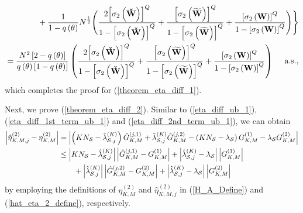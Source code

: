 \documentclass[11pt, draftclsnofoot, onecolumn]{IEEEtran}
\newcommand{\cW}{{\check{W}}}
\newcommand{\tW}{{\widetilde{W}}}
\begin{document}
\begin{IEEEproof}
\begin{align}
& \qquad \qquad + \frac{1}{{1 - q\left( \theta  \right)}}{N^{\frac{1}{2}}}\Bigg( {\frac{{2{{\left[ {{\sigma _2}\left( {\bf{\cW}} \right)} \right]}^Q}}}{{1 - {{\left[ {{\sigma _2}\left( {\bf{\cW}} \right)} \right]}^Q}}} + \frac{{{{\left[ {{\sigma _2}\left( {\bf{\tW}} \right)} \right]}^Q}}}{{1 - {{\left[ {{\sigma _2}\left( {\bf{\tW}} \right)} \right]}^Q}}} + \frac{{{{\left[ {{\sigma _2}\left( {\bf{W}} \right)} \right]}^Q}}}{{1 - {{\left[ {{\sigma _2}\left( {\bf{W}} \right)} \right]}^Q}}}} \Bigg) \Bigg\}\\
& = \frac{ {N^2} \left[{2 - q\left( \theta  \right)} \right] }{{q\left( \theta  \right)\left[ {1 - q\left( \theta  \right)} \right]}}\left( {\frac{{2{{\left[ {{\sigma _2}\left( {\bf{\cW}} \right)} \right]}^Q}}}{{1 - {{\left[ {{\sigma _2}\left( {\bf{\cW}} \right)} \right]}^Q}}} + \frac{{{{\left[ {{\sigma _2}\left( {\bf{\tW}} \right)} \right]}^Q}}}{{1 - {{\left[ {{\sigma _2}\left( {\bf{\tW}} \right)} \right]}^Q}}} + \frac{{{{\left[ {{\sigma _2}\left( {\bf{W}} \right)} \right]}^Q}}}{{1 - {{\left[ {{\sigma _2}\left( {\bf{W}} \right)} \right]}^Q}}}} \right) \quad \text{ a.s.},
\end{align}
which completes the proof for (\ref{theorem_eta_diff_1}).

Next, we prove (\ref{theorem_eta_diff_2}).
Similar to (\ref{eta_diff_ub_1}), (\ref{eta_diff_1st_term_ub_1}) and (\ref{eta_diff_2nd_term_ub_1}), we can obtain
\begin{align} \notag
\left| {\hat \eta _{K,M,j}^{(2)} - \eta _{K,M}^{(2)}} \right| &  = \left| {\left( {K{N_{\cal S}} - \hat \lambda _{{\cal S},j}^{(K)}} \right)\hat G_{K,M}^{(j,1)} + \hat \lambda _{{\cal S},j}^{(K)}\hat G_{K,M}^{(j,2)} - \left( {K{N_{\cal S}} - {\lambda _{\cal S}}} \right)G_{K,M}^{(1)} - {\lambda _{\cal S}}G_{K,M}^{(2)}} \right| \\ \notag
& \le \left| {K{N_{\cal S}} - \hat \lambda _{{\cal S},j}^{(K)}} \right|\left| {\hat G_{K,M}^{(j,1)} - G_{K,M}^{(1)}} \right| + \left| {\hat \lambda _{{\cal S},j}^{(K)} - {\lambda _{\cal S}}} \right|\left| {G_{K,M}^{(1)}} \right| \\ \label{eta_2_diff_ub_1}
& \qquad + \left| {\hat \lambda _{{\cal S},j}^{(K)}} \right|\left| {\hat G_{K,M}^{(j,2)} - G_{K,M}^{(2)}} \right| + \left| {\hat \lambda _{{\cal S},j}^{(K)} - {\lambda _{\cal S}}} \right|\left| {G_{K,M}^{(2)}} \right|
\end{align}
by employing the definitions of ${\eta _{K,M}^{(2)}}$ and ${\hat \eta _{K,M,j}^{(2)}}$ in (\ref{H_A_Define}) and (\ref{hat_eta_2_define}), respectively.


\end{IEEEproof}
\end{document}
